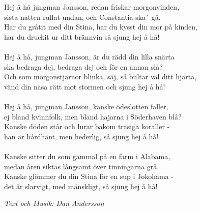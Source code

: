 \vspace{10pt}
Hej å hå jungman Jansson, redan friskar morgonvinden,\\
sista natten rullat undan, och Constantia ska´ gå.\\
Har du gråtit med din Stina, har du kysst din mor på kinden,\\
har du druckit ur ditt brännvin så sjung hej å hå!\\
\\
Hej å hå, jungman Jansson, är du rädd din lilla snärta\\
ska bedraga dej, bedraga dej och för en annan slå?\\
Och som morgonstjärnor blinka, säj, så bultar väl ditt hjärta,\\
vänd din näsa rätt mot stormen och sjung hej å hå!\\
\\
Hej å hå, jungman Jansson, kanske ödeslotten faller,\\
ej bland kvinnfolk, men bland hajarna i Söderhaven blå?\\
Kanske döden står och lurar bakom trasiga koraller -\\
han är hårdhänt, men hederlig, så sjung hej å hå!\\
\\
Kanske sitter du som gammal på en farm i Alabama,\\
medan åren siktas långsamt över tinningarna grå.\\
Kanske glömmer du din Stina för en sup i Jokohama -\\
det är slarvigt, med mänskligt, så sjung hej å hå!
\par
\vspace{10pt}
{\footnotesize\textit{Text och Musik: Dan Andersson}}

